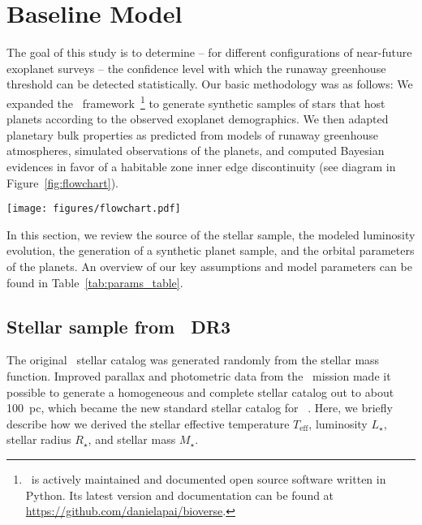 \documentclass[twocolumn,twocolappendix]{aastex631}
\begin{document}
\section{Baseline Model}\label{sec:met_baseline}
The goal of this study is to determine -- for different configurations of near-future exoplanet surveys -- the confidence level with which the runaway greenhouse threshold can be detected statistically. %
Our basic methodology was as follows:
We expanded the \bioverse\ framework~\citep{Bixel2020,Bixel2021}\footnote{\bioverse\ is actively maintained and documented open source software written in Python. Its latest version and documentation can be found at \url{https://github.com/danielapai/bioverse}.} to generate synthetic samples of stars that host planets according to the observed exoplanet demographics.
We then adapted planetary bulk properties as predicted from models of runaway greenhouse atmospheres, simulated observations of the planets, and computed Bayesian evidences in favor of a habitable zone inner edge discontinuity (see diagram in Figure~\ref{fig:flowchart}).
\begin{figure*}
    \begin{centering}
        \texttt{[image: figures/flowchart.pdf]}
        \caption{Workflow of our hypothesis testing with \bioverse. First, we generate a sample of stars and populate them with planets based on \kepler\ demographics.
            A fraction of them are then assigned a runaway greenhouse climate based on the model described in Sect.~\ref{sec:met_rghmodel}.
        We then simulate an exoplanet survey, whereby selection effects and detection biases are introduced. Finally, we test the runaway greenhouse hypothesis based on data from the survey simulation.
        By iterating through these steps, we compute the statistical power of testing the hypothesis for different survey designs.}
        \label{fig:flowchart}
    \end{centering}
\end{figure*}
In this section, we review the source of the stellar sample, the modeled luminosity evolution, the generation of a synthetic planet sample, and the orbital parameters of the planets.
An overview of our key assumptions and model parameters can be found in Table~\ref{tab:params_table}.



\subsection{Stellar sample from \gaia\ DR3}
The original \bioverse\ stellar catalog was generated randomly from the \citet{Chabrier2003} stellar mass function.
Improved parallax and photometric data from the \gaia\ mission made it possible to generate a homogeneous and complete stellar catalog out to about 100~pc, which became the new standard stellar catalog for \bioverse ~\citep{Hardegree-Ullman2023}.
Here, we briefly describe how we derived the stellar effective temperature $T_{\mathrm{eff}}$, luminosity $L_{\star}$, stellar radius $R_{\star}$, and stellar mass $M_{\star}$.
\end{document}
